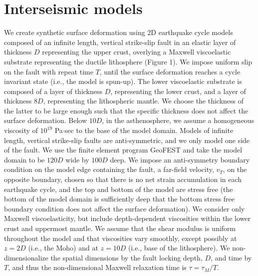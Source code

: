 \section{Interseismic models}
We create synthetic surface deformation using 2D earthquake cycle
models composed of an infinite length, vertical strike-slip fault in
an elastic layer of thickness $D$ representing the upper crust,
overlying a Maxwell viscoelastic substrate representing the ductile
lithosphere (Figure 1). We impose uniform slip on the fault with
repeat time $T$, until the surface deformation reaches a cycle
invariant state (i.e., the model is spun-up). The lower
viscoelastic substrate is composed of a layer of thickness $D$,
representing the lower crust, and a layer of thickness $8D$,
representing the lithospheric mantle. We choose the thickness of the
latter to be large enough such that the specific thickness does not
affect the surface deformation.  Below $10D$, in the asthenosphere, we
assume a homogeneous viscosity of $10^{19}$ Pa$\cdot$sec to the base
of the model domain.  Models of infinite length, vertical strike-slip
faults are anti-symmetric, and we only model one side of the fault. We
use the finite element program GeoFEST \citep{Lyzenga2000} and take
the model domain to be $120D$ wide by $100D$ deep. We impose an
anti-symmetry boundary condition on the model edge containing the
fault, a far-field velocity, $v_T$, on the opposite boundary, chosen
so that there is no net strain accumulation in each earthquake cycle,
and the top and bottom of the model are stress free (the bottom of the
model domain is sufficiently deep that the bottom stress free boundary
condition does not affect the surface deformation).  We consider only
Maxwell viscoelasticity, but include depth-dependent viscosities
within the lower crust and uppermost mantle. We assume that the shear
modulus is uniform throughout the model and that viscosities vary
smoothly, except possibly at $z = 2D$ (i.e., the Moho) and at $z
= 10D$ (i.e., base of the lithosphere).  We non-dimensionalize
the spatial dimensions by the fault locking depth, $D$, and time by
$T$, and thus the non-dimensional Maxwell relaxation time is $\tau =
\tau_M/T$.

